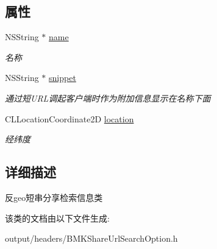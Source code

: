 \subsection*{属性}
\begin{DoxyCompactItemize}
\item 
\hypertarget{interface_b_m_k_location_share_u_r_l_option_a11f562286c830a4e78f9c7f1d40aded4}{}N\+S\+String $\ast$ \hyperlink{interface_b_m_k_location_share_u_r_l_option_a11f562286c830a4e78f9c7f1d40aded4}{name}\label{interface_b_m_k_location_share_u_r_l_option_a11f562286c830a4e78f9c7f1d40aded4}

\begin{DoxyCompactList}\small\item\em 名称 \end{DoxyCompactList}\item 
\hypertarget{interface_b_m_k_location_share_u_r_l_option_a9eb77e28dac4084933eb17cd3adef344}{}N\+S\+String $\ast$ \hyperlink{interface_b_m_k_location_share_u_r_l_option_a9eb77e28dac4084933eb17cd3adef344}{snippet}\label{interface_b_m_k_location_share_u_r_l_option_a9eb77e28dac4084933eb17cd3adef344}

\begin{DoxyCompactList}\small\item\em 通过短\+U\+R\+L调起客户端时作为附加信息显示在名称下面 \end{DoxyCompactList}\item 
\hypertarget{interface_b_m_k_location_share_u_r_l_option_adecb9b65fe164ed23f271b0693bfa354}{}C\+L\+Location\+Coordinate2\+D \hyperlink{interface_b_m_k_location_share_u_r_l_option_adecb9b65fe164ed23f271b0693bfa354}{location}\label{interface_b_m_k_location_share_u_r_l_option_adecb9b65fe164ed23f271b0693bfa354}

\begin{DoxyCompactList}\small\item\em 经纬度 \end{DoxyCompactList}\end{DoxyCompactItemize}


\subsection{详细描述}
反geo短串分享检索信息类 

该类的文档由以下文件生成\+:\begin{DoxyCompactItemize}
\item 
output/headers/B\+M\+K\+Share\+Url\+Search\+Option.\+h\end{DoxyCompactItemize}
